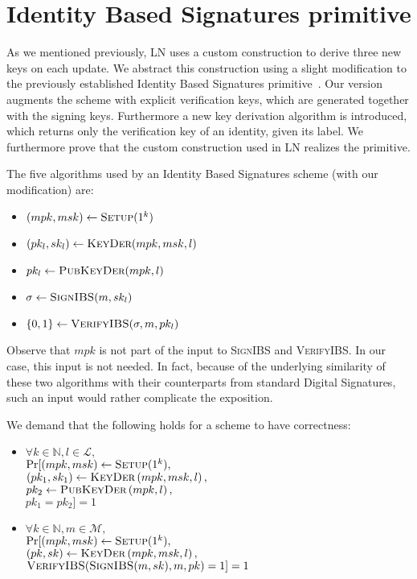 \section{Identity Based Signatures primitive}
  As we mentioned previously, LN uses a custom construction to derive three new
  keys on each update. We abstract this construction using a slight modification
  to the previously established Identity Based Signatures
  primitive~\cite{ibspaterson,ibsshamir}. Our version augments the scheme with
  explicit verification keys, which are generated together with the signing
  keys. Furthermore a new key derivation algorithm is introduced, which returns
  only the verification key of an identity, given its label. We furthermore
  prove that the custom construction used in LN realizes the primitive.

  The five algorithms used by an Identity Based Signatures scheme (with our
  modification) are:
  \begin{itemize}
    \item $(mpk, msk) \leftarrow \textsc{Setup}(1^k)$
    \item $(pk_l, sk_l) \leftarrow \textsc{KeyDer}(mpk, msk, l)$
    \item $pk_l \leftarrow \textsc{PubKeyDer}(mpk, l)$
    \item $\sigma \leftarrow \textsc{SignIBS}(m, sk_l)$
    \item $\{0, 1\} \leftarrow \textsc{VerifyIBS}(\sigma, m, pk_l)$
  \end{itemize}
  Observe that $mpk$ is not part of the input to \textsc{SignIBS} and
  \textsc{VerifyIBS}. In our case, this input is not needed. In fact, because
  of the underlying similarity of these two algorithms with their
  counterparts from standard Digital Signatures, such an input would rather
  complicate the exposition.

  We demand that the following holds for a scheme to have correctness:
  \begin{itemize}
    \item $\forall k \in \mathbb{N}, l \in \mathcal{L},$ \\
    $\Pr[(mpk, msk) \gets \textsc{Setup}(1^k),$ \\
    $(pk_1, sk_1) \gets \textsc{KeyDer}\left(mpk, msk, l\right),$ \\
    $pk_2 \gets \textsc{PubKeyDer}\left(mpk, l\right),$ \\
    $pk_1 = pk_2] = 1$

    \item $\forall k \in \mathbb{N}, m \in \mathcal{M},$ \\
    $\Pr[(mpk, msk) \gets \textsc{Setup}(1^k),$ \\
    $(pk, sk) \gets \textsc{KeyDer}\left(mpk, msk, l\right),$ \\
    $\textsc{VerifyIBS}(\textsc{SignIBS}(m, sk), m, pk) = 1] = 1$
  \end{itemize}

